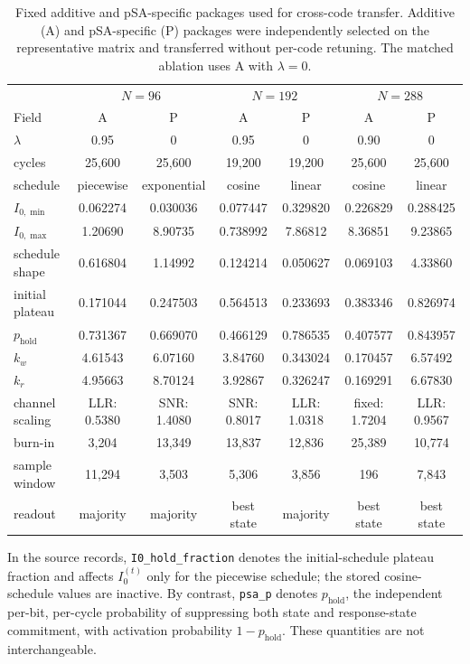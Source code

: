 \documentclass[aps,prapplied,preprint,superscriptaddress,longbibliography,floatfix]{revtex4-2}
\begin{document}
\clearpage

\begin{table}[ht]
\caption{Fixed additive and pSA-specific packages used for cross-code transfer.  Additive (A) and pSA-specific (P) packages were independently selected on the representative matrix and transferred without per-code retuning.  The matched ablation uses A with $\lambda=0$.}
\label{tabS:parameters}
\scriptsize
\begin{ruledtabular}
\begin{tabular}{lcccccc}
& \multicolumn{2}{c}{$N=96$} & \multicolumn{2}{c}{$N=192$} & \multicolumn{2}{c}{$N=288$} \\
Field & A & P & A & P & A & P \\
\hline
$\lambda$ & 0.95 & 0 & 0.95 & 0 & 0.90 & 0 \\
cycles & 25,600 & 25,600 & 19,200 & 19,200 & 25,600 & 25,600 \\
schedule & piecewise & exponential & cosine & linear & cosine & linear \\
$I_{0,\min}$ & 0.062274 & 0.030036 & 0.077447 & 0.329820 & 0.226829 & 0.288425 \\
$I_{0,\max}$ & 1.20690 & 8.90735 & 0.738992 & 7.86812 & 8.36851 & 9.23865 \\
schedule shape & 0.616804 & 1.14992 & 0.124214 & 0.050627 & 0.069103 & 4.33860 \\
initial plateau & 0.171044 & 0.247503 & 0.564513 & 0.233693 & 0.383346 & 0.826974 \\
$p_{\mathrm{hold}}$ & 0.731367 & 0.669070 & 0.466129 & 0.786535 & 0.407577 & 0.843957 \\
$k_w$ & 4.61543 & 6.07160 & 3.84760 & 0.343024 & 0.170457 & 6.57492 \\
$k_r$ & 4.95663 & 8.70124 & 3.92867 & 0.326247 & 0.169291 & 6.67830 \\
channel scaling & LLR: 0.5380 & SNR: 1.4080 & SNR: 0.8017 & LLR: 1.0318 & fixed: 1.7204 & LLR: 0.9567 \\
burn-in & 3,204 & 13,349 & 13,837 & 12,836 & 25,389 & 10,774 \\
sample window & 11,294 & 3,503 & 5,306 & 3,856 & 196 & 7,843 \\
readout & majority & majority & best state & majority & best state & best state \\
\end{tabular}
\end{ruledtabular}
\end{table}

In the source records, \texttt{I0\_hold\_fraction} denotes the initial-schedule plateau fraction and affects $I_0^{(t)}$ only for the piecewise schedule; the stored cosine-schedule values are inactive.  By contrast, \texttt{psa\_p} denotes $p_{\mathrm{hold}}$, the independent per-bit, per-cycle probability of suppressing both state and response-state commitment, with activation probability $1-p_{\mathrm{hold}}$.  These quantities are not interchangeable.
\end{document}
